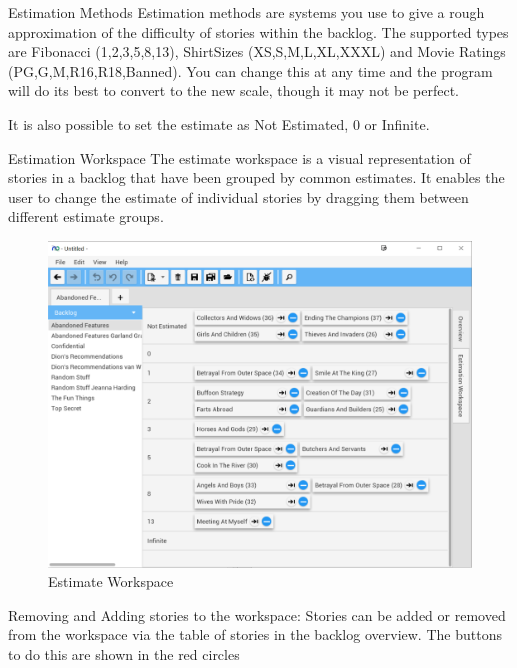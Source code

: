 \bigskip
Estimation Methods
\newline
Estimation methods are systems you use to give a rough approximation of the difficulty of stories within the backlog. The supported types are Fibonacci (1,2,3,5,8,13), ShirtSizes (XS,S,M,L,XL,XXXL) and Movie Ratings (PG,G,M,R16,R18,Banned). You can change this at any time and the program will do its best to convert to the new scale, though it may not be perfect. 

It is also possible to set the estimate as Not Estimated, 0 or Infinite.

\pagebreak
Estimation Workspace
\newline
The estimate workspace is a visual representation of stories in a backlog that have been grouped by common estimates. It enables the user to change the estimate of individual stories by dragging them between different estimate groups.

\begin{figure}[H]
\centering
\includegraphics[width=\textwidth]{images/screenshots/estimationWorkspace1.PNG}
\caption{Estimate Workspace}
\label{fig:new_project}
\end{figure}

\pagebreak
Removing and Adding stories to the workspace:
Stories can be added or removed from the workspace via the table of stories in the backlog overview. 
The buttons to do this are shown in the red circles

